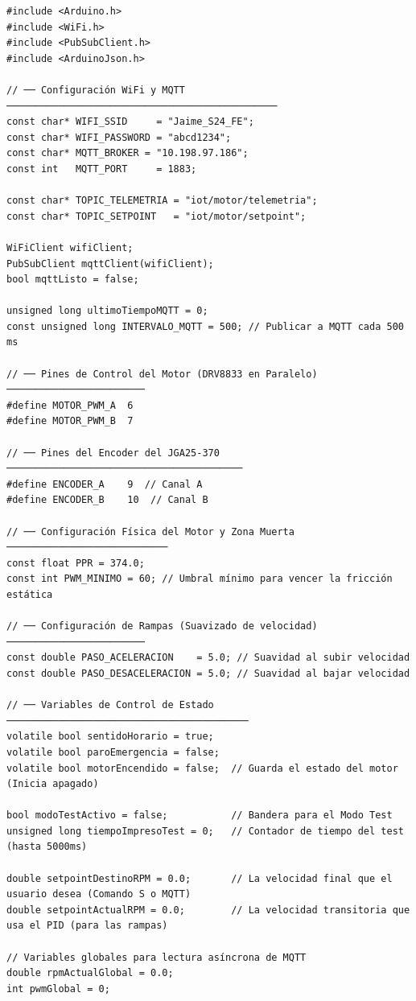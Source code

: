 \documentclass[11pt, letterpaper]{article}
\begin{document}
\begin{lstlisting}[caption={main.cpp --- PID + MQTT + publicaci\'on a InfluxDB}]
#include <Arduino.h>
#include <WiFi.h>
#include <PubSubClient.h>
#include <ArduinoJson.h>

// ── Configuración WiFi y MQTT ───────────────────────────────────────────────
const char* WIFI_SSID     = "Jaime_S24_FE";
const char* WIFI_PASSWORD = "abcd1234";
const char* MQTT_BROKER = "10.198.97.186";
const int   MQTT_PORT     = 1883;

const char* TOPIC_TELEMETRIA = "iot/motor/telemetria";
const char* TOPIC_SETPOINT   = "iot/motor/setpoint";

WiFiClient wifiClient;
PubSubClient mqttClient(wifiClient);
bool mqttListo = false;

unsigned long ultimoTiempoMQTT = 0;
const unsigned long INTERVALO_MQTT = 500; // Publicar a MQTT cada 500 ms

// ── Pines de Control del Motor (DRV8833 en Paralelo) ────────────────────────
#define MOTOR_PWM_A  6
#define MOTOR_PWM_B  7

// ── Pines del Encoder del JGA25-370 ─────────────────────────────────────────
#define ENCODER_A    9  // Canal A 
#define ENCODER_B    10  // Canal B 

// ── Configuración Física del Motor y Zona Muerta ────────────────────────────
const float PPR = 374.0; 
const int PWM_MINIMO = 60; // Umbral mínimo para vencer la fricción estática

// ── Configuración de Rampas (Suavizado de velocidad) ────────────────────────
const double PASO_ACELERACION    = 5.0; // Suavidad al subir velocidad
const double PASO_DESACELERACION = 5.0; // Suavidad al bajar velocidad

// ── Variables de Control de Estado ──────────────────────────────────────────
volatile bool sentidoHorario = true;  
volatile bool paroEmergencia = false; 
volatile bool motorEncendido = false;  // Guarda el estado del motor (Inicia apagado)

bool modoTestActivo = false;           // Bandera para el Modo Test
unsigned long tiempoImpresoTest = 0;   // Contador de tiempo del test (hasta 5000ms)

double setpointDestinoRPM = 0.0;       // La velocidad final que el usuario desea (Comando S o MQTT)
double setpointActualRPM = 0.0;        // La velocidad transitoria que usa el PID (para las rampas)

// Variables globales para lectura asíncrona de MQTT
double rpmActualGlobal = 0.0;
int pwmGlobal = 0;


\end{lstlisting}
\end{document}
